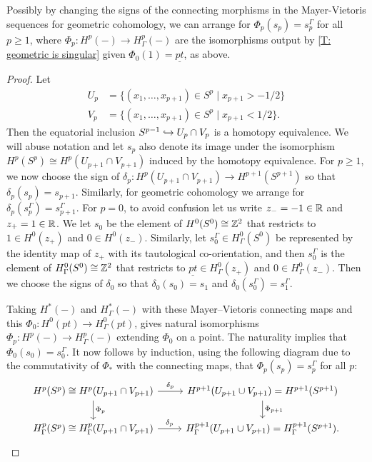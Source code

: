 \begin{lemma}\label{L: connecting signs}
	Possibly by changing the signs of the connecting morphisms in the Mayer-Vietoris sequences for geometric cohomology, we can arrange for $\Phi_p(s_p) = s_p^\Gamma$ for all $p \geq 1$, where $\Phi_p \colon H^p(-) \to H^p_\Gamma(-)$ are the isomorphisms output by \cref{T: geometric is singular} given $\Phi_0(1) = \underline{pt}$, as above.
\end{lemma}
\begin{proof}
	Let
	\begin{align*}
		U_p& = \{(x_1,\ldots,x_{p+1}) \in S^p \mid x_{p+1}>-1/2\}\\
		V_p& = \{(x_1,\ldots,x_{p+1}) \in S^p \mid x_{p+1}<1/2\}.
	\end{align*}
	Then the equatorial inclusion $S^{p-1} \hookrightarrow U_p \cap V_p$ is a homotopy equivalence.
	We will abuse notation and let $s_p$ also denote its image under the isomorphism $H^{p}(S^p) \cong  H^{p}(U_{p+1} \cap V_{p+1})$ induced by the homotopy equivalence.
	For $p\geq 1$, we now choose the sign of $\delta_p \colon H^{p}(U_{p+1} \cap V_{p+1}) \to H^{p+1}(S^{p+1})$ so that $\delta_p(s_p) = s_{p+1}$.
	Similarly, for geometric cohomology we arrange for $\delta_p(s_p^\Gamma) = s_{p+1}^\Gamma$.
	For $p = 0$, to avoid confusion let us write $z_- = -1 \in \mathbb{R}$ and $z_+ = 1 \in \mathbb{R}$.
	We let $s_0$ be the element of $H^0(S^0) \cong \mathbb{Z}^2$ that restricts to $1 \in H^0(z_+)$ and $0 \in H^0(z_-)$.
	Similarly, let $s_0^\Gamma \in H^0_\Gamma(S^0)$ be represented by the identity map of $z_+$ with its tautological co-orientation, and then $s_0^\Gamma$ is the element of $H^0_\Gamma(S^0) \cong \mathbb{Z}^2$ that restricts to $\underline{pt} \in H^0_\Gamma(z_+)$ and $0 \in H^0_\Gamma(z_-)$.
	Then we choose the signs of $\delta_0$ so that $\delta_0(s_0) = s_{1}$ and $\delta_0(s_0^\Gamma) = s_{1}^\Gamma$.

	Taking $H^*(-)$ and $H^*_\Gamma(-)$ with these Mayer--Vietoris connecting maps and this $\Phi_0 \colon H^0(pt) \to H^0_\Gamma(pt)$, \cite[Theorem 10]{Krec10b} gives natural isomorphisms $\Phi_p \colon H^p(-) \to H^p_\Gamma(-)$ extending $\Phi_0$ on a point.
	The naturality implies that $\Phi_0(s_0) = s_0^\Gamma$.
	It now follows by induction, using the following diagram due to the commutativity of $\Phi_*$ with the connecting maps, that $\Phi_p(s_p) = s_p^\Gamma$ for all $p$:
	\[
	\begin{tikzcd}
		H^p(S^p) \cong H^p(U_{p+1} \cap V_{p+1}) \arrow{r}{\delta_p} \arrow[d, "\Phi_p"] &
		H^{p+1}(U_{p+1} \cup V_{p+1}) = H^{p+1}(S^{p+1}) \arrow[d, "\Phi_{p+1}"] \\
		H^p_\Gamma(S^p) \cong H^p_\Gamma(U_{p+1} \cap V_{p+1}) \arrow{r}{\delta_p} &
		H_\Gamma^{p+1}(U_{p+1} \cup V_{p+1}) = H^{p+1}_\Gamma(S^{p+1}).
	\end{tikzcd}
	\]
\end{proof}

